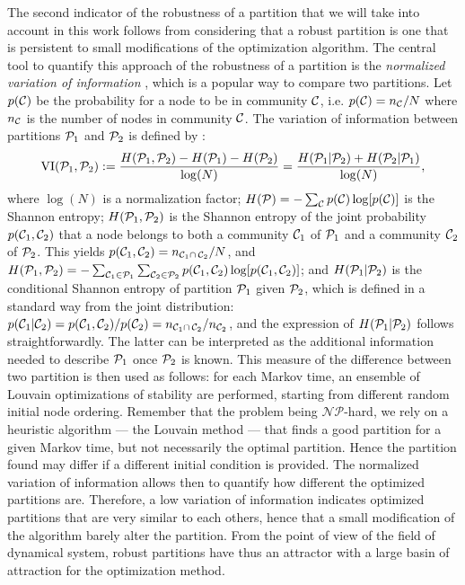 \begin{sloppypar} 
The second indicator of the robustness of a partition that we will take into account in this work follows from considering that a robust partition is one that is persistent to small modifications of the optimization algorithm. The central tool to quantify this approach of the robustness of a partition is the \textit{normalized variation of information} \cite{meilua2007comparing}, which is a popular way to compare two partitions. Let $p(\C)$ be the probability for a node to be in community $\C$, i.e. $p(\C) = n_\C/N$ where $n_\C$ is the number of nodes in community $\C$. The variation of information between partitions $\P_1$ and $\P_2$ is defined by :
\begin{equation} \label{eq:clustering_VI}
	\VI(\P_1,\P_2) := \frac{H(\P_1,\P_2)-H(\P_1)-H(\P_2)}{\log (N)} = \frac{H(\P_1|\P_2)+H(\P_2|\P_1)}{\log (N)},
\end{equation}
where $\log(N)$ is a normalization factor; $H(\P) = -\sum_{\C} p(\C) \log[p(\C)]$ is the Shannon entropy; $H(\P_1,\P_2)$ is the Shannon entropy of the joint probability $p(\C_1,\C_2)$ that a node belongs to both a community $\C_1$ of $\P_1$ and a community $\C_2$ of $\P_2$. This yields $p(\C_1,\C_2) = n_{\C_1 \cap\, \C_2}/N$, and $H(\P_1,\P_2) = -\sum_{\C_1 \in \P_1} \sum_{\C_2 \in \P_2} p(\C_1,\C_2) \log[p(\C_1,\C_2)]$; and $H(\P_1|\P_2)$ is the conditional Shannon entropy of partition $\P_1$ given $\P_2$, which is defined in a standard way from the joint distribution: $p(\C_1|\C_2) = p(\C_1,\C_2)/p(\C_2) = n_{\C_1\cap\, \C_2}/n_{\C_2}$, and the expression of $H(\P_1|\P_2)$ follows straightforwardly. The latter can be interpreted as the additional information needed to describe $\P_1$ once $\P_2$ is known. This measure of the difference between two partition is then used as follows: for each Markov time, an ensemble of Louvain optimizations of stability are performed, starting from different random initial node ordering. Remember that the problem being $\mathcal{NP}$-hard, we rely on a heuristic algorithm --- the Louvain method --- that finds a good partition for a given Markov time, but not necessarily the optimal partition. Hence the partition found may differ if a different initial condition is provided. The normalized variation of information allows then to quantify how different the optimized partitions are. Therefore, a low variation of information indicates optimized partitions that are very similar to each others, hence that a small modification of the algorithm barely alter the partition. From the point of view of the field of dynamical system, robust partitions have thus an attractor with a large basin of attraction for the optimization method. 
\end{sloppypar}


